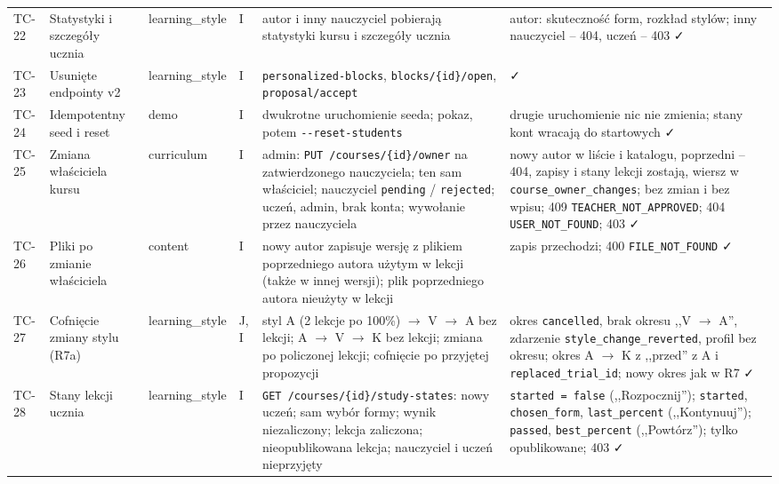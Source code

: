 \begin{longtable}{p{1cm} >{\raggedright\arraybackslash}p{3.2cm} >{\raggedright\arraybackslash}p{1.6cm} p{0.6cm} >{\raggedright\arraybackslash}p{4.3cm} >{\raggedright\arraybackslash}p{4.3cm}}
\addlinespace
\midrule
TC-22 & Statystyki i szczegóły ucznia & learning\_style & I &
  autor i inny nauczyciel pobierają statystyki kursu i szczegóły ucznia &
  autor: skuteczność form, rozkład stylów; inny nauczyciel -- 404, uczeń -- 403 \faCheck \\
\addlinespace
TC-23 & Usunięte endpointy v2 & learning\_style & I &
  \texttt{personalized-blocks}, \texttt{blocks/\{id\}/open}, \texttt{proposal/accept} &
  404 \faCheck \\
\addlinespace
TC-24 & Idempotentny seed i reset & demo & I &
  dwukrotne uruchomienie seeda; pokaz, potem \texttt{-{}-reset-students} &
  drugie uruchomienie nic nie zmienia; stany kont wracają do startowych \faCheck \\
\addlinespace
\midrule
TC-25 & Zmiana właściciela kursu & curriculum & I &
  admin: \texttt{PUT /courses/\{id\}/owner} na zatwierdzonego nauczyciela; ten sam właściciel; nauczyciel \texttt{pending} / \texttt{rejected}; uczeń, admin, brak konta; wywołanie przez nauczyciela &
  nowy autor w liście i katalogu, poprzedni -- 404, zapisy i stany lekcji zostają, wiersz w \texttt{course\_owner\_changes}; bez zmian i bez wpisu; 409 \texttt{TEACHER\_NOT\_APPROVED}; 404 \texttt{USER\_NOT\_FOUND}; 403 \faCheck \\
\addlinespace
TC-26 & Pliki po zmianie właściciela & content & I &
  nowy autor zapisuje wersję z plikiem poprzedniego autora użytym w lekcji (także w innej wersji); plik poprzedniego autora nieużyty w lekcji &
  zapis przechodzi; 400 \texttt{FILE\_NOT\_FOUND} \faCheck \\
\addlinespace
TC-27 & Cofnięcie zmiany stylu (R7a) & learning\_style & J, I &
  styl A (2 lekcje po 100\%) $\to$ V $\to$ A bez lekcji; A $\to$ V $\to$ K bez lekcji; zmiana po policzonej lekcji; cofnięcie po przyjętej propozycji &
  okres \texttt{cancelled}, brak okresu ,,V $\to$ A'', zdarzenie \texttt{style\_change\_reverted}, profil bez okresu; okres A $\to$ K z ,,przed'' z A i \texttt{replaced\_trial\_id}; nowy okres jak w R7 \faCheck \\
\addlinespace
TC-28 & Stany lekcji ucznia & learning\_style & I &
  \texttt{GET /courses/\{id\}/study-states}: nowy uczeń; sam wybór formy; wynik niezaliczony; lekcja zaliczona; nieopublikowana lekcja; nauczyciel i uczeń nieprzyjęty &
  \texttt{started = false} (,,Rozpocznij''); \texttt{started}, \texttt{chosen\_form}, \texttt{last\_percent} (,,Kontynuuj''); \texttt{passed}, \texttt{best\_percent} (,,Powtórz''); tylko opublikowane; 403 \faCheck \\

\end{longtable}
